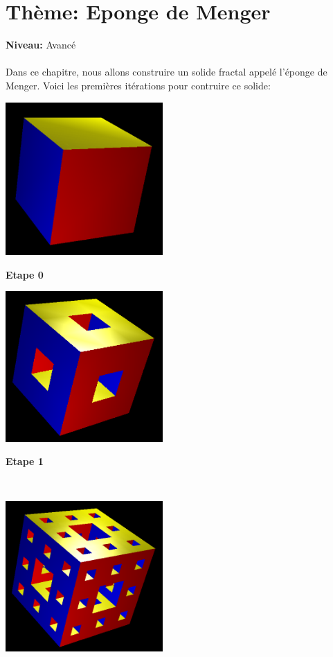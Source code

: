 \chapter{Thème: Eponge de Menger}
{ }\hfill\textbf{Niveau:} Avancé\\ \\
Dans ce chapitre, nous allons construire un solide fractal appelé l'éponge de Menger. Voici les premières itérations pour contruire ce solide:
\begin{center}
\begin{minipage}{6cm}
\includegraphics[width=6cm]{images/menger0.png}
\begin{center}
 \textbf{Etape 0}
\end{center}
\end{minipage}
\begin{minipage}{6cm}
\includegraphics[width=6cm]{images/menger1.png}
\begin{center}
 \textbf{Etape 1}
\end{center}
\end{minipage}
\\
\begin{minipage}{6cm}
\includegraphics[width=6cm]{images/menger2.png}

\end{minipage}
\end{center}
